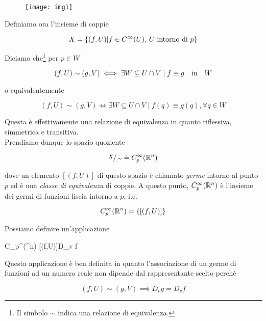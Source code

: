 \begin{figure}[H]
	\centering
	\texttt{[image: img1]}
\end{figure}

Definiamo ora l'insieme di coppie

\begin{equation}
	X \doteq \left\{ (f,U) \middle| f \in C^{\infty}(U), \, \text{$ U $ intorno di $ p $} \right\}
\end{equation}

Diciamo che\footnote{%
	Il simbolo $ \sim $ indica una relazione di equivalenza.%
} per $ p \in W $

\begin{equation}
	(f,U) \sim (g,V) \iff \exists W \subseteq U \cap V \mid f \equiv g \qq{in} W
\end{equation}

o equivalentemente

\begin{equation}
	(f,U) \sim (g,V) \iff \exists W \subseteq U \cap V \mid f(q) \equiv g(q), \forall q \in W
\end{equation}

Questa è effettivamente una relazione di equivalenza in quanto riflessiva, simmetrica e transitiva.\\
Prendiamo dunque lo spazio quoziente

\begin{equation}
	\sfrac{X}{\sim} \doteq C_{p}^{\infty}(\mathbb{R}^{n})
\end{equation}

dove un elemento $ [(f,U)] $ di questo spazio è chiamato \textit{germe} intorno al punto $ p $ ed è una \textit{classe di equivalenza} di coppie. A questo punto, $ C_{p}^{\infty}(\mathbb{R}^{n}) $ è l'insieme dei germi di funzioni liscia intorno a $ p $, i.e.

\begin{equation}
	C_{p}^{\infty}(\mathbb{R}^{n}) = \left\{ [(f,U)] \right\}
\end{equation} 

Possiamo definire un'applicazione

%
	{C_{p}^{\infty}(\R^{n})}{\R}%
	{[(f,U)]}{D_{v} f}

Questa applicazione è ben definita in quanto l'associazione di un germe di funzioni ad un numero reale non dipende dal rappresentante scelto perché

\begin{equation}
	(f,U) \sim (g,V) \implies D_{v} g = D_{v} f
\end{equation}


